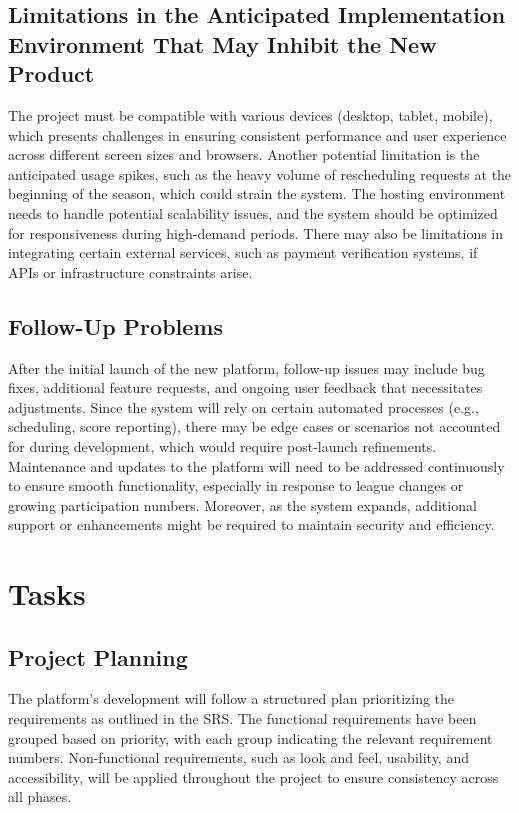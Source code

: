 \documentclass[12pt]{article}
\begin{document}
\subsection{Limitations in the Anticipated Implementation Environment That May
Inhibit the New Product}
The project must be compatible with various devices (desktop, tablet, mobile), which presents challenges in ensuring consistent performance and user experience across different screen sizes and browsers. Another potential limitation is the anticipated usage spikes, such as the heavy volume of rescheduling requests at the beginning of the season, which could strain the system. The hosting environment needs to handle potential scalability issues, and the system should be optimized for responsiveness during high-demand periods. There may also be limitations in integrating certain external services, such as payment verification systems, if APIs or infrastructure constraints arise.
\subsection{Follow-Up Problems}
After the initial launch of the new platform, follow-up issues may include bug fixes, additional feature requests, and ongoing user feedback that necessitates adjustments. Since the system will rely on certain automated processes (e.g., scheduling, score reporting), there may be edge cases or scenarios not accounted for during development, which would require post-launch refinements. Maintenance and updates to the platform will need to be addressed continuously to ensure smooth functionality, especially in response to league changes or growing participation numbers. Moreover, as the system expands, additional support or enhancements might be required to maintain security and efficiency.

\section{Tasks}

\subsection{Project Planning}
The platform’s development will follow a structured plan prioritizing the requirements as outlined in the SRS. The functional requirements have been grouped based on priority, with each group indicating the relevant requirement numbers. Non-functional requirements, such as look and feel, usability, and accessibility, will be applied throughout the project to ensure consistency across all phases.
\end{document}
